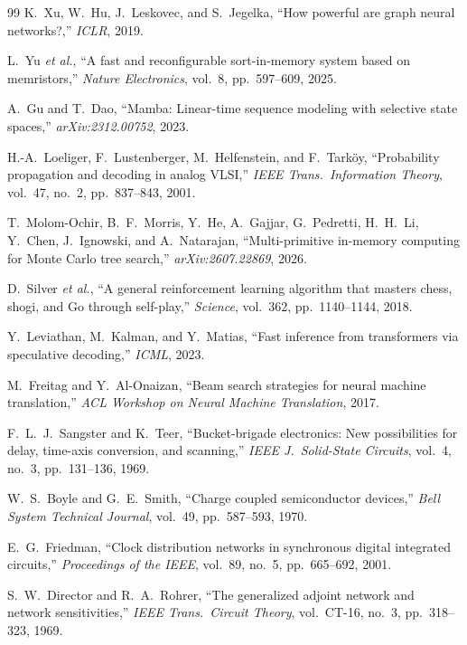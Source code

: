 \documentclass[11pt]{article}
\begin{document}
\begin{thebibliography}{99}
 K.~Xu, W.~Hu, J.~Leskovec, and S.~Jegelka, ``How powerful are graph neural networks?,'' \textit{ICLR}, 2019.

 L.~Yu \textit{et al.}, ``A fast and reconfigurable sort-in-memory system based on memristors,'' \textit{Nature Electronics}, vol.~8, pp.~597--609, 2025.

 A.~Gu and T.~Dao, ``Mamba: Linear-time sequence modeling with selective state spaces,'' \textit{arXiv:2312.00752}, 2023.

 H.-A.~Loeliger, F.~Lustenberger, M.~Helfenstein, and F.~Tark\"oy, ``Probability propagation and decoding in analog VLSI,'' \textit{IEEE Trans.\ Information Theory}, vol.~47, no.~2, pp.~837--843, 2001.

 T.~Molom-Ochir, B.~F.~Morris, Y.~He, A.~Gajjar, G.~Pedretti, H.~H.~Li, Y.~Chen, J.~Ignowski, and A.~Natarajan, ``Multi-primitive in-memory computing for Monte Carlo tree search,'' \textit{arXiv:2607.22869}, 2026.

 D.~Silver \textit{et al.}, ``A general reinforcement learning algorithm that masters chess, shogi, and Go through self-play,'' \textit{Science}, vol.~362, pp.~1140--1144, 2018.

 Y.~Leviathan, M.~Kalman, and Y.~Matias, ``Fast inference from transformers via speculative decoding,'' \textit{ICML}, 2023.

 M.~Freitag and Y.~Al-Onaizan, ``Beam search strategies for neural machine translation,'' \textit{ACL Workshop on Neural Machine Translation}, 2017.

 F.~L.~J.~Sangster and K.~Teer, ``Bucket-brigade electronics: New possibilities for delay, time-axis conversion, and scanning,'' \textit{IEEE J.\ Solid-State Circuits}, vol.~4, no.~3, pp.~131--136, 1969.

 W.~S.~Boyle and G.~E.~Smith, ``Charge coupled semiconductor devices,'' \textit{Bell System Technical Journal}, vol.~49, pp.~587--593, 1970.

 E.~G.~Friedman, ``Clock distribution networks in synchronous digital integrated circuits,'' \textit{Proceedings of the IEEE}, vol.~89, no.~5, pp.~665--692, 2001.

 S.~W.~Director and R.~A.~Rohrer, ``The generalized adjoint network and network sensitivities,'' \textit{IEEE Trans.\ Circuit Theory}, vol.~CT-16, no.~3, pp.~318--323, 1969.


\end{thebibliography}
\end{document}
